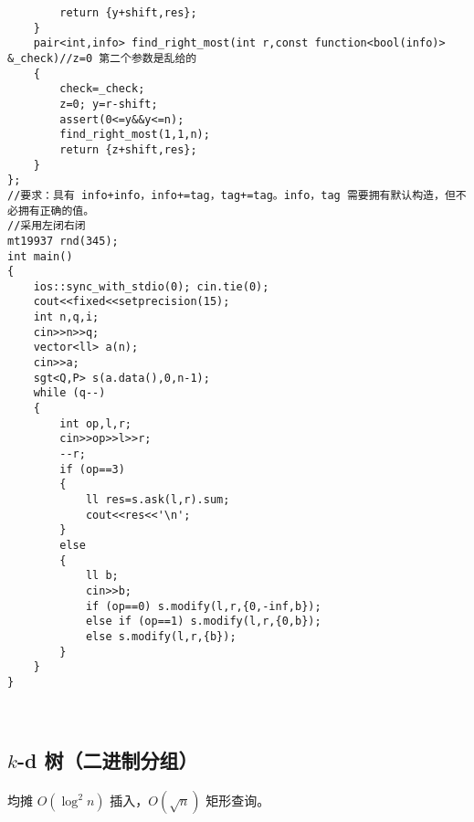 \documentclass[12pt]{ctexart}
\begin{document}
\begin{lstlisting}
		return {y+shift,res};
	}
	pair<int,info> find_right_most(int r,const function<bool(info)> &_check)//z=0 第二个参数是乱给的
	{
		check=_check;
		z=0; y=r-shift;
		assert(0<=y&&y<=n);
		find_right_most(1,1,n);
		return {z+shift,res};
	}
};
//要求：具有 info+info，info+=tag，tag+=tag。info，tag 需要拥有默认构造，但不必拥有正确的值。
//采用左闭右闭
mt19937 rnd(345);
int main()
{
	ios::sync_with_stdio(0); cin.tie(0);
	cout<<fixed<<setprecision(15);
	int n,q,i;
	cin>>n>>q;
	vector<ll> a(n);
	cin>>a;
	sgt<Q,P> s(a.data(),0,n-1);
	while (q--)
	{
		int op,l,r;
		cin>>op>>l>>r;
		--r;
		if (op==3)
		{
			ll res=s.ask(l,r).sum;
			cout<<res<<'\n';
		}
		else
		{
			ll b;
			cin>>b;
			if (op==0) s.modify(l,r,{0,-inf,b});
			else if (op==1) s.modify(l,r,{0,b});
			else s.modify(l,r,{b});
		}
	}
}

	
\end{lstlisting}

\subsection{$k$-d 树（二进制分组）}

均摊 $O(\log ^2n)$ 插入，$O(\sqrt n)$ 矩形查询。
\end{document}

